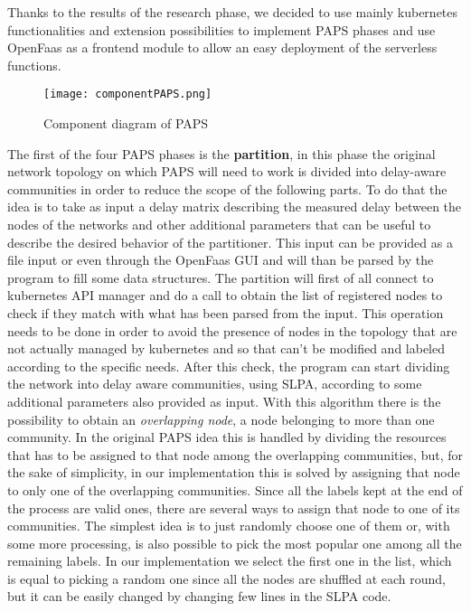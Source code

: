 Thanks to the results of the research phase, we decided to use mainly kubernetes functionalities
and extension possibilities to implement PAPS phases and use OpenFaas as a frontend module to 
allow an easy deployment of the serverless functions.
\begin{figure}[h]
    \texttt{[image: componentPAPS.png]}
    \label{fig:component}
    \caption{Component diagram of PAPS}
\end{figure}

The first of the four PAPS phases is the \textbf{partition}, in this phase the original 
network topology on which PAPS will need to work is divided into delay-aware communities in 
order to reduce the scope of the following parts. To do that the idea is to take as input a 
delay matrix describing the measured delay between the nodes of the networks and other 
additional parameters that can be useful to describe the desired behavior of the partitioner.
This input can be provided as a file input or even through the OpenFaas GUI and will than be
parsed by the program to fill some data structures. The partition will first of all connect to 
kubernetes API manager and do a call to obtain the list of registered nodes to check if they 
match with what has been parsed from the input. This operation needs to be done in order to
avoid the presence of nodes in the topology that are not actually managed by kubernetes and 
so that can't be modified and labeled according to the specific needs. 
After this check, the program can start dividing the network into delay aware communities,
using SLPA, according to some additional parameters also provided as input. With this 
algorithm there is the possibility to obtain an \textit{overlapping node}, a node belonging 
to more than one community. In the original PAPS idea this is handled by dividing the resources
that has to be assigned to that node among the overlapping communities, but, for the sake of 
simplicity, in our implementation this is solved by assigning that node to only one of the 
overlapping communities. Since all the labels kept at the end of the process are valid ones,
there are several ways to assign that node to one of its communities.
The simplest idea is to just randomly choose one of them or,
with some more processing, is also possible to pick the most popular one among all the 
remaining labels. In our implementation we select the first one in the list, which is 
equal to picking a random one since all the nodes are shuffled at each round, but it can 
be easily changed by changing few lines in the SLPA code.


